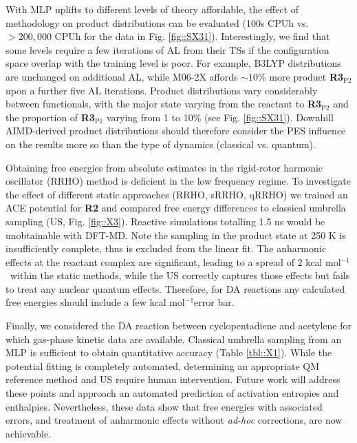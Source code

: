 \documentclass[twoside,twocolumn,9pt]{article}
\newcommand{\kcal}{kcal mol$^{-1}$}
\begin{document}
With MLP uplifts to different levels of theory affordable, the effect of methodology on product distributions can be evaluated (100s CPUh vs. $>200,000$ CPUh for the data in Fig. \ref{fig::SX31}).  Interestingly, we find that some levels require a few iterations of AL from their TSs if the configuration space overlap with the training level is poor. For example, B3LYP distributions are unchanged on additional AL, while M06-2X affords $\sim10$\% more product {\bfseries{R3$_\text{P2}$}} upon a further five AL iterations. Product distributions vary considerably between functionals, with the major state varying from the reactant to {\bfseries{R3$_\text{P2}$}} and the proportion of {\bfseries{R3$_\text{P1}$}} varying from 1 to 10\% (see Fig. \ref{fig::SX31}). Downhill AIMD-derived product distributions should therefore consider the PES influence on the results more so than the type of dynamics (classical vs. quantum).


Obtaining free energies from absolute estimates in the rigid-rotor harmonic oscillator (RRHO) method is deficient in the low frequency regime.\cite{Liu2017} To investigate the effect of different static approaches (RRHO, sRRHO,\cite{Ribeiro2011} qRRHO\cite{Grimme2012}) we trained an ACE potential for {\bfseries{R2}} and compared free energy differences to classical umbrella sampling (US, Fig. \ref{fig::X3}). Reactive simulations totalling 1.5 ns would be unobtainable with DFT-MD. Note the sampling in the product state at 250 K is insufficiently complete, thus is excluded from the linear fit. The anharmonic effects at the reactant complex are significant, leading to a spread of 2 \kcal~within the static methods, while the US correctly captures those effects but fails to treat any nuclear quantum effects. Therefore, for DA reactions any calculated free energies should include a few \kcal error bar.

Finally, we considered the DA reaction between cyclopentadiene and acetylene for which gas-phase kinetic data are available.\cite{Walsh1975} Classical umbrella sampling from an MLP is sufficient to obtain quantitative accuracy (Table \ref{tbl::X1}). While the potential fitting is completely automated, determining an appropriate QM reference method and US require human intervention. Future work will address these points and approach an automated prediction of activation entropies and enthalpies. Nevertheless, these data show that free energies with associated errors, and treatment of anharmonic effects without \emph{ad-hoc} corrections, are now achievable.
\end{document}
